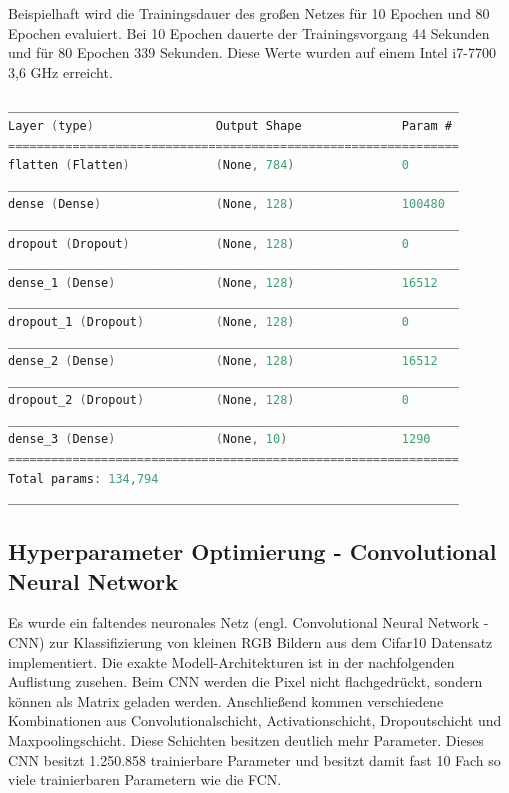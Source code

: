 \begin{itemize}
Beispielhaft wird die Trainingsdauer des großen Netzes für 10 Epochen und 80 Epochen evaluiert. Bei 10 Epochen dauerte der Trainingsvorgang 44 Sekunden und für 80 Epochen 339 Sekunden. Diese Werte wurden auf einem Intel i7-7700 3,6 GHz erreicht. 

{\small
\begin{lstlisting}[language=C,caption=Exakte Modell-Architektur des großen Fully-Conneted-Networks,label=auflistung_fully_groß]
_______________________________________________________________
Layer (type)                 Output Shape              Param #
===============================================================
flatten (Flatten)            (None, 784)               0
_______________________________________________________________
dense (Dense)                (None, 128)               100480
_______________________________________________________________
dropout (Dropout)            (None, 128)               0
_______________________________________________________________
dense_1 (Dense)              (None, 128)               16512
_______________________________________________________________
dropout_1 (Dropout)          (None, 128)               0
_______________________________________________________________
dense_2 (Dense)              (None, 128)               16512
_______________________________________________________________
dropout_2 (Dropout)          (None, 128)               0
_______________________________________________________________
dense_3 (Dense)              (None, 10)                1290
===============================================================
Total params: 134,794
_______________________________________________________________
\end{lstlisting}
}


\end{itemize}

\subsection{Hyperparameter Optimierung - Convolutional Neural Network}
Es wurde ein faltendes neuronales Netz (engl. Convolutional Neural Network - CNN) zur Klassifizierung von kleinen RGB Bildern aus dem Cifar10 Datensatz implementiert. Die exakte Modell-Architekturen ist in der nachfolgenden Auflistung zusehen.
Beim CNN werden die Pixel nicht flachgedrückt, sondern können als Matrix geladen werden. Anschließend kommen verschiedene Kombinationen aus Convolutionalschicht, Activationschicht, Dropoutschicht und Maxpoolingschicht. Diese Schichten besitzen deutlich mehr Parameter. Dieses CNN besitzt 1.250.858 trainierbare Parameter und besitzt damit fast 10 Fach so viele trainierbaren Parametern wie die FCN.

